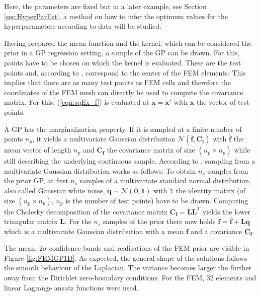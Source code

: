 \documentclass[%
  a4paper,oneside,%
  11pt,%
  smallchapters,
  style=printdev,
  extramargin,
  green,%
  rgb, <cmyk>
  ]{tubsbook}
\begin{document}
%
Here, the parameters are fixed but in a later example, see Section \ref{sec:HyperParEst}, a method on how to infer the optimum values for the hyperparameters according to data will be studied.

Having prepared the mean function and the kernel, which can be considered the prior in a GP regression setting, a sample of the GP can be drawn. For this, points have to be chosen on which the kernel is evaluated. These are the test points and, according to \cite{girolami2021}, correspond to the center of the FEM elements. This implies that there are as many test points as FEM cells and therefore the coordinates of the FEM mesh can directly be used to compute the covariance matrix. For this, (\ref{eqn:sqEx_f}) is evaluated at $\bm{x} = \bm{x}'$ with $\bm{x}$ the vector of test points. 

A GP has the marginalization property. If it is sampled at a finite number of points $n_p$, it yields a multivariate Gaussian distribution $\mathcal{N}(\bar{\bm{f}},\bm{C_f})$ with $\bar{\bm{f}}$ the mean vector of length $n_p$ and $\bm{C_f}$ the covariance matrix of size $(n_p \times n_p)$ while still describing the underlying continuous sample.
According to \cite[p. 201]{rasmussen2006}, sampling from a multivariate Gaussian distribution works as follows: To obtain $n_s$ samples from the prior GP, at first $n_s$ samples of a multivariate standard normal distribution, also called Gaussian white noise, $\bm{q} \sim \mathcal{N}(\bm{0},\mathbb{1})$ with $\mathbb{1}$ the identity matrix (of size $(n_p \times n_p)$, $n_p$ is the number of test points) have to be drawn. Computing the Cholesky decomposition of the covariance matrix $\bm{C_f} = \bm{L}\bm{L}^T$ yields the lower triangular matrix $\bm{L}$. For the $n_s$ samples of the prior there now holds $\bm{f} = \bar{\bm{f}} + \bm{L}\bm{q}$ which is a multivariate Gaussian distribution with a mean $\bm{f}$ and a covariance $\bm{C_f}$.

The mean, $2\sigma$ confidence bands and realisations of the FEM prior are visible in Figure \ref{fig:FEMGP1D}. As expected, the general shape of the solutions follows the smooth behaviour of the Laplacian. The variance becomes larger the further away from the Dirichlet zero-boundary conditions. For the FEM, $32$ elements and linear Lagrange ansatz functions were used.
\end{document}
